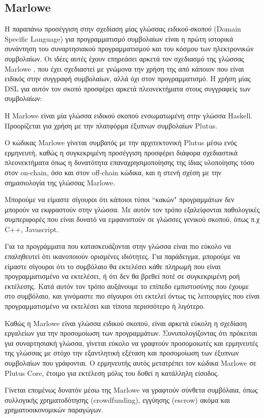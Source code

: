 \subsection{Marlowe}

Η παραπάνω προσέγγιση στην σχεδίαση μίας γλώσσας \emph{ειδικού-σκοπού}  (Domain Specific Language)
για προγραμματισμό συμβολαίων είναι η πρώτη ιστορικά
συνάντηση του συναρτησιακού προγραμματισμού και του κόσμου των ηλεκτρονικών συμβολαίων.
Οι ιδέες αυτές έχουν επηρεάσει αρκετά τον σχεδιασμό της γλώσσας Marlowe \cite{marlowe}, που έχει
σχεδιαστεί με γνώμονα την χρήση της από κάποιον που είναι ειδικός στην συγγραφή συμβολαίων, αλλά
όχι στον προγραμματισμό. Η χρήση μίας DSL για αυτόν τον σκοπό προσφέρει αρκετά πλεονεκτήματα
στους συγγραφείς των συμβολαίων:

Η Marlowe είναι μία γλώσσα ειδικού σκοπού ενσωματωμένη στην γλώσσα Haskell. Προορίζεται για χρήση
με την πλατφόρμα έξυπνων συμβολαίων Plutus.

Ο κώδικας Marlowe γίνεται συμβατός με την αρχιτεκτονική Plutus μέσω ενός ερμηνευτή, καθώς η
συγκεκριμένη προσέγγιση προσφέρει διάφορα σχεδιαστικά πλεονεκτήματα όπως η δυνατότητα
επαναχρησιμοποίησης της ίδιας υλοποίησης τόσο στον on-chain, όσο και στον off-chain κώδικα,
και η στενή σχέση με την σημασιολογία της γλώσσας Marlowe.


Μπορούμε να είμαστε σίγουροι ότι κάποιοι τύποι ``κακών" προγραμμάτων δεν μπορούν να εκφραστούν
στην γλώσσα. Με αυτόν τον τρόπο εξαλείφονται παθολογικές συμπεριφορές που είναι δυνατό να εμφανιστούν
σε γλώσσες γενικού σκοπού, όπως π.χ C++, Javascript.

Για τα προγράμματα που κατασκευάζονται στην γλώσσα είναι πιο εύκολο να επαληθευτεί ότι
ικανοποιούν ορισμένες ιδιότητες. Για παράδειγμα, μπορούμε να είμαστε σίγουροι ότι το συμβόλαιο θα
εκτελέσει κάθε πληρωμή που είναι προγραμματισμένο να εκτελέσει, ή ότι δεν θα βρεθεί ποτέ σε
συγκεκριμένη ροή εκτέλεσης. Κατά αυτόν τον τρόπο αυξάνουμε το επίπεδο εμπιστοσύνης που έχουμε
στο συμβόλαιο, και γινόμαστε πιο σίγουροι ότι εκτελεί όντως τις λειτουργίες που είναι προγραμματισμένο
να εκτελέσει και τίποτα περισσότερο ή λιγότερο.

Καθώς η Marlowe είναι γλώσσα ειδικού σκοπού, είναι αρκετά εύκολη η σχεδίαση εργαλείων για την
προσομοίωση των προγραμμάτων. Συνυπολογίζοντας ότι πρόκειται για συναρτησιακή γλώσσα, γίνεται
εύκολο να γραφτούν προσομοιωτές και ερμηνευτές της γλώσσας με στόχο την εξαντλητική εξέταση και
προσομοίωση των έξυπνων συμβολαίων που γράφονται. Ο ερμηνευτής αυτός μετατρέπει τον κώδικα
Marlowe σε Plutus Core, έτοιμο για εκτέλεση μόλις του δοθεί η κατάλληλη είσοδος.

Γίνεται επομένως δυνατόν μέσω της Marlowe να γραφτούν σύνθετα συμβόλαια, όπως συλλογικής
χρηματοδότησης (crowdfunding), εγγύησης (escrow) ακόμα και χρηματοοικονομικών παραγώγων.

